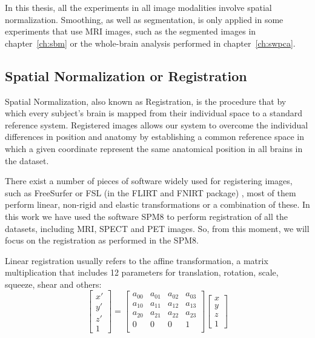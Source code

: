 In this thesis, all the experiments in all image modalities involve spatial normalization. Smoothing, as well as segmentation, is only applied in some experiments that use \ac{MRI} images, such as the segmented images in chapter~\ref{ch:sbm} or the whole-brain analysis performed in chapter~\ref{ch:swpca}. 

\subsection{Spatial Normalization or Registration}
Spatial Normalization, also known as Registration, is the procedure that by which every subject's brain is mapped from their individual space to a standard reference system. Registered images allows our system to overcome the individual differences in position and anatomy by establishing a common reference space in which a given coordinate represent the same anatomical position in all brains in the dataset. 

There exist a number of pieces of software widely used for registering images, such as FreeSurfer \cite{Reuter2010} or FSL (in the FLIRT and FNIRT package) \cite{Smith2004}, most of them perform linear, non-rigid and elastic transformations or a combination of these. In this work we have used the software SPM8 \cite{spm_book} to perform registration of all the datasets, including \ac{MRI}, \ac{SPECT} and \ac{PET} images. So, from this moment, we will focus on the registration as performed in the \ac{SPM8}. 

Linear registration usually refers to the affine transformation, a matrix multiplication that includes 12 parameters for translation, rotation, scale, squeeze, shear and others: 
\begin{equation}\label{eq:affine}
	\left[\begin{matrix}
	x'\\y'\\z'\\1
	\end{matrix}\right]
	 = \left[\begin{matrix}
	 a_{00} & a_{01} & a_{02} & a_{03}\\
	 a_{10} & a_{11} & a_{12} & a_{13}\\
	 a_{20} & a_{21} & a_{22} & a_{23}\\
	 0 & 0 & 0 & 1\\
	 \end{matrix}\right]
	 \left[\begin{matrix}
	 x\\y\\z\\1
	 \end{matrix}\right]
\end{equation}

